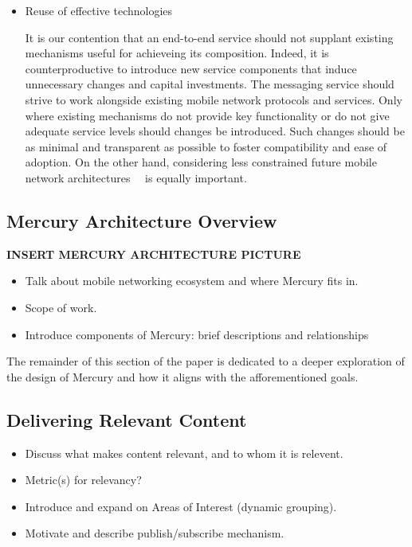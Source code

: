 \begin{itemize}
\item Reuse of effective technologies

It is our contention that an end-to-end service should not supplant
existing mechanisms useful for achieveing its composition.  Indeed, it
is counterproductive to introduce new service components that induce
unnecessary changes and capital investments. The messaging service
should strive to work alongside existing mobile network protocols and
services.  Only where existing mechanisms do not provide key
functionality or do not give adequate service levels should changes be
introduced.  Such changes should be as minimal and transparent as
possible to foster compatibility and ease of adoption. On the other
hand, considering less constrained future mobile network
architectures~\cite{5G}~\cite{MobilityFirst} is equally important.

\end{itemize}

\subsection{Mercury Architecture Overview}

{\bf INSERT MERCURY ARCHITECTURE PICTURE}

\begin{itemize}
\item Talk about mobile networking ecosystem and where Mercury fits in.
\item Scope of work.
\item Introduce components of Mercury: brief descriptions and relationships
\end{itemize}
  
The remainder of this section of the paper is dedicated to a deeper
exploration of the design of Mercury and how it aligns with the
afforementioned goals.

\subsection{Delivering Relevant Content}

\begin{itemize}
\item Discuss what makes content relevant, and to whom it is relevent.
\item Metric(s) for relevancy?
\item Introduce and expand on Areas of Interest (dynamic grouping).
\item Motivate and describe publish/subscribe mechanism.
\end{itemize}

